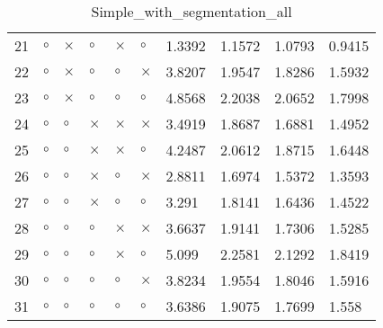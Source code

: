 \begin{table}[H]
\begin{tabular}{|P{0.7cm}|P{1.3cm}P{1.3cm}P{1.3cm}P{1.3cm}P{1.3cm}|P{1.1cm}P{1.1cm}P{1.1cm}P{1.1cm}|}
  21 &  $\circ$ & $\times$ &  $\circ$ & $\times$ &     $\circ$ &          1.3392 &          1.1572 &        1.0793 &         0.9415 \\
  22 &  $\circ$ & $\times$ &  $\circ$ &  $\circ$ &    $\times$ &          3.8207 &          1.9547 &        1.8286 &         1.5932 \\
  23 &  $\circ$ & $\times$ &  $\circ$ &  $\circ$ &     $\circ$ &          4.8568 &          2.2038 &        2.0652 &         1.7998 \\
  24 &  $\circ$ &  $\circ$ & $\times$ & $\times$ &    $\times$ &          3.4919 &          1.8687 &        1.6881 &         1.4952 \\
  25 &  $\circ$ &  $\circ$ & $\times$ & $\times$ &     $\circ$ &          4.2487 &          2.0612 &        1.8715 &         1.6448 \\
  26 &  $\circ$ &  $\circ$ & $\times$ &  $\circ$ &    $\times$ &          2.8811 &          1.6974 &        1.5372 &         1.3593 \\
  27 &  $\circ$ &  $\circ$ & $\times$ &  $\circ$ &     $\circ$ &           3.291 &          1.8141 &        1.6436 &         1.4522 \\
  28 &  $\circ$ &  $\circ$ &  $\circ$ & $\times$ &    $\times$ &          3.6637 &          1.9141 &        1.7306 &         1.5285 \\
  29 &  $\circ$ &  $\circ$ &  $\circ$ & $\times$ &     $\circ$ &           5.099 &          2.2581 &        2.1292 &         1.8419 \\
  30 &  $\circ$ &  $\circ$ &  $\circ$ &  $\circ$ &    $\times$ &          3.8234 &          1.9554 &        1.8046 &         1.5916 \\
  31 &  $\circ$ &  $\circ$ &  $\circ$ &  $\circ$ &     $\circ$ &          3.6386 &          1.9075 &        1.7699 &          1.558 \\
\hline
\end{tabular}
\caption{Simple_with_segmentation_all}
\label{tab:}
\end{table}
